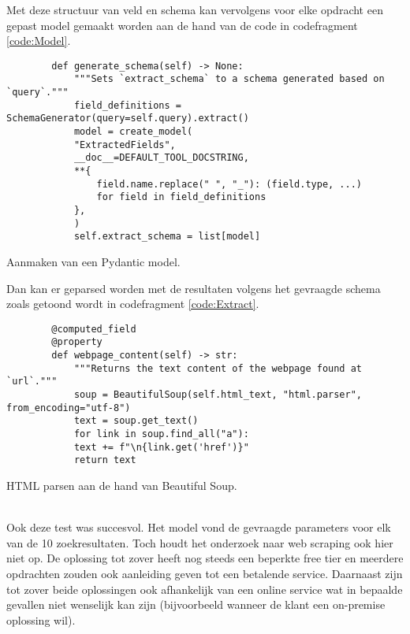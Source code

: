 Met deze structuur van veld en schema kan vervolgens voor elke opdracht een gepast model gemaakt worden aan de hand van de code in codefragment \ref{code:Model}.
\begin{listing}[h!]
    \begin{verbatim}
        def generate_schema(self) -> None:
            """Sets `extract_schema` to a schema generated based on `query`."""
            field_definitions = SchemaGenerator(query=self.query).extract()
            model = create_model(
            "ExtractedFields",
            __doc__=DEFAULT_TOOL_DOCSTRING,
            **{
                field.name.replace(" ", "_"): (field.type, ...)
                for field in field_definitions
            },
            )
            self.extract_schema = list[model]
    \end{verbatim}
    \caption[Pydantic model]{Aanmaken van een Pydantic model.}
    \label{code:Model}
\end{listing}
Dan kan er geparsed worden met de resultaten volgens het gevraagde schema zoals getoond wordt in codefragment \ref{code:Extract}.
\begin{listing}[h!]
    \begin{verbatim}
        @computed_field
        @property
        def webpage_content(self) -> str:
            """Returns the text content of the webpage found at `url`."""
            soup = BeautifulSoup(self.html_text, "html.parser", from_encoding="utf-8")
            text = soup.get_text()
            for link in soup.find_all("a"):
            text += f"\n{link.get('href')}"
            return text
    \end{verbatim}
    \caption[Beatiful Soup HTML parser]{HTML parsen aan de hand van Beautiful Soup.}
    \label{code:Extract}
\end{listing}
\\
Ook deze test was succesvol. Het model vond de gevraagde parameters voor elk van de 10 zoekresultaten. Toch houdt het onderzoek naar web scraping ook hier niet op. De oplossing tot zover heeft nog steeds een beperkte free tier en meerdere opdrachten zouden ook aanleiding geven tot een betalende service.
Daarnaast zijn tot zover beide oplossingen ook afhankelijk van een online service wat in bepaalde gevallen niet wenselijk kan zijn (bijvoorbeeld wanneer de klant een on-premise oplossing wil).
